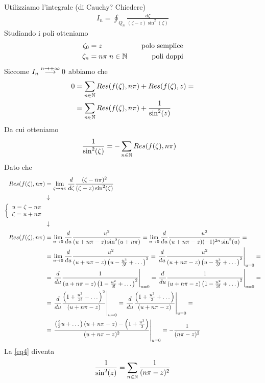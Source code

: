 Utilizziamo l'integrale (di Cauchy? Chiedere)
\begin{align}
	I_n = \oint_{Q_n} \frac{d\zeta}{(\zeta -z) \sin^2(\zeta)}
\end{align}
Studiando i poli otteniamo
\begin{align}
	\zeta_0 &= z \quad &\text{polo semplice}\\
	\zeta_n &= n\pi \; n\in \mathbb{N}  \quad &\text{poli doppi}
\end{align}
Siccome $I_n \overset{n \rightarrow +\infty}{\longrightarrow} 0$ abbiamo che
\begin{align}
	0 &= \sum_{n\in \mathbb{N}} Res(f(\zeta), n\pi) + Res(f(\zeta), z) =\nonumber\\
	&= \sum_{n\in \mathbb{N}} Res(f(\zeta), n\pi) + \frac{1}{\sin^2(z)}  \label{eq4}
\end{align}
Da cui otteniamo
\begin{align}
	\frac{1}{\sin^2(\zeta)} &= -\sum_{n\in \mathbb{N}} Res(f(\zeta), n\pi)
\end{align}
Dato che
\begin{align}
	Res(f(\zeta), n\pi) &= \underset{\zeta \rightarrow n\pi}{\lim} \, \frac{d}{d\zeta} \frac{(\zeta - n\pi)^2}{(\zeta - z) \sin^2(\zeta)} \\ &\downarrow \nonumber \\
	\left\{ \begin{array}{cc} u=\zeta - n\pi\\ \zeta = u + n\pi \end{array} \right. \nonumber \\ &\downarrow \nonumber \\
	Res(f(\zeta), n\pi) &= \underset{u \rightarrow 0}{\lim} \, \frac{d}{du} \frac{u^2}{(u + n\pi - z) \sin^2(u + n\pi)} =  \underset{u \rightarrow 0}{\lim} \, \frac{d}{du} \frac{u^2}{(u + n\pi - z) (-1)^{2n} \sin^2(u)}= \nonumber\\
	&= \underset{u \rightarrow 0}{\lim} \, \frac{d}{du} \frac{u^2}{(u + n\pi - z) \left(u -\frac{u^3}{3!} + \dots\right)^2} = \left. \frac{d}{du} \frac{u^2}{(u + n\pi - z) \left(u -\frac{u^3}{3!} + \dots\right)^2} \right|_{u=0} = \nonumber \\
	&= \left. \frac{d}{du} \frac{1}{(u + n\pi - z) \left(1 -\frac{u^2}{3!} + \dots\right)^2} \right|_{u=0} = \left. \frac{d}{du} \frac{1}{(u + n\pi - z) \left(1 -\frac{u^2}{3!} + \dots\right)^2} \right|_{u=0} = \nonumber \\
	&= \left. \frac{d}{du} \frac{\left(1 +\frac{u^2}{3!} - \dots\right)^2}{(u + n\pi - z) } \right|_{u=0} = \left. \frac{d}{du} \frac{\left(1 +\frac{u^2}{3} + \dots\right)}{(u + n\pi - z) } \right|_{u=0} = \nonumber \\
	&= \left. \frac{\left( \frac{2}{3} u + \dots \right) (u + n\pi-z ) - \left(1 + \frac{u^2}{3}\right)}{(u+ n\pi -z)^2} \right|_{u=0} = -\frac{1}{(n\pi -z)^2}
\end{align}
La \ref{eq4} diventa
\begin{align}
	\frac{1}{\sin^2(z)} = \sum_{n\in \mathbb{N}} \frac{1}{(n\pi -z)^2}
\end{align}

\newpage
